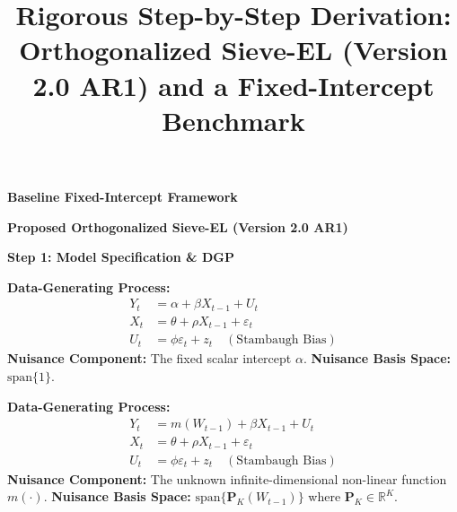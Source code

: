 \documentclass[11pt,landscape]{article}
\begin{document}
\title{\vspace{-1.5cm}Rigorous Step-by-Step Derivation: Orthogonalized Sieve-EL (Version 2.0 AR1) and a Fixed-Intercept Benchmark}
\date{}
\maketitle

\vspace{-1.5cm}
\noindent\hrulefill

\vspace{0.5em}
\noindent
\begin{minipage}[t]{0.48\textwidth}
    \begin{center}
        \Large \textbf{Baseline Fixed-Intercept Framework}
    \end{center}
\end{minipage}%
\hfill
\begin{minipage}[t]{0.48\textwidth}
    \begin{center}
        \Large \textbf{Proposed Orthogonalized Sieve-EL (Version 2.0 AR1)}
    \end{center}
\end{minipage}

\vspace{0.5em}
\noindent\hrulefill
\vspace{1em}

\noindent\textbf{\large Step 1: Model Specification \& DGP} \vspace{0.5em}

\noindent
\begin{minipage}[t]{0.48\textwidth}
\textbf{Data-Generating Process:}
\begin{align}
    Y_t &= \alpha + \beta X_{t-1} + U_t \\
    X_t &= \theta + \rho X_{t-1} + \varepsilon_t \\
    U_t &= \phi \varepsilon_t + z_t \quad (\text{Stambaugh Bias})
\end{align}
\textbf{Nuisance Component:} The fixed scalar intercept $\alpha$. \newline
\textbf{Nuisance Basis Space:} $\text{span}\{1\}$.
\end{minipage}%
\hfill
\begin{minipage}[t]{0.48\textwidth}
\textbf{Data-Generating Process:}
\begin{align}
    Y_t &= m(W_{t-1}) + \beta X_{t-1} + U_t \\
    X_t &= \theta + \rho X_{t-1} + \varepsilon_t \\
    U_t &= \phi \varepsilon_t + z_t \quad (\text{Stambaugh Bias})
\end{align}
\textbf{Nuisance Component:} The unknown infinite-dimensional non-linear function $m(\cdot)$. \newline
\textbf{Nuisance Basis Space:} $\text{span}\{\bm{P}_K(W_{t-1})\}$ where $\bm{P}_K \in \mathbb{R}^K$.
\end{minipage}
\end{document}
